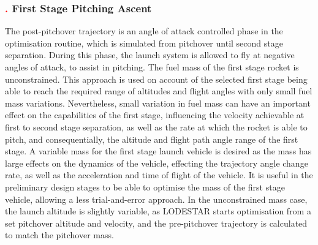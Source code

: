 \subsubsection{\textcolor{red}{.} First Stage Pitching Ascent}


The post-pitchover trajectory is an angle of attack controlled phase in the optimisation routine, which is simulated from pitchover until second stage separation. During this phase, the launch system is allowed to fly at negative angles of attack, to assist in pitching. 
The fuel mass of the first stage rocket is unconstrained.
This approach is used on account of the selected first stage being able to reach the required range of altitudes and flight angles with only small fuel mass variations. 
Nevertheless, small variation in fuel mass can have an important effect on the capabilities of the first stage, influencing the velocity achievable at first to second stage separation, as well as the rate at which the rocket is able to pitch, and consequentially, the altitude and flight path angle range of the first stage.
A variable mass for the first stage launch vehicle is desired as the mass has large effects on the dynamics of the vehicle, effecting the trajectory angle change rate, as well as the acceleration and time of flight of the vehicle.
It is useful in the preliminary design stages to be able to optimise the mass of the first stage vehicle, allowing a less trial-and-error approach.
In the unconstrained mass case, the launch altitude is slightly variable, as LODESTAR starts optimisation from a set pitchover altitude and velocity, and the pre-pitchover trajectory is calculated to match the pitchover mass. 



